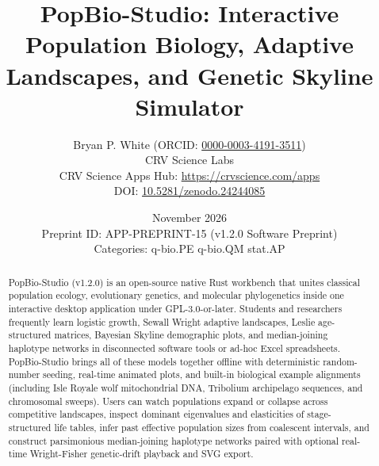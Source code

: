 \documentclass[10pt,letterpaper]{article}
\title{\textbf{PopBio-Studio: Interactive Population Biology, Adaptive Landscapes, and Genetic Skyline Simulator}}
\author{Bryan P. White (ORCID: \href{https://orcid.org/0000-0003-4191-3511}{0000-0003-4191-3511}) \\ CRV Science Labs \\ \small CRV Science Apps Hub: \url{https://crvscience.com/apps} \\ \small DOI: \href{https://doi.org/10.5281/zenodo.24244085}{10.5281/zenodo.24244085}}
\date{November 2026 \\ \small Preprint ID: APP-PREPRINT-15 (v1.2.0 Software Preprint) \\ \small Categories: q-bio.PE \textbullet{} q-bio.QM \textbullet{} stat.AP}
\begin{document}
\maketitle

\begin{abstract}
PopBio-Studio (v1.2.0) is an open-source native Rust workbench that unites classical population ecology, evolutionary genetics, and molecular phylogenetics inside one interactive desktop application under GPL-3.0-or-later. Students and researchers frequently learn logistic growth, Sewall Wright adaptive landscapes, Leslie age-structured matrices, Bayesian Skyline demographic plots, and median-joining haplotype networks in disconnected software tools or ad-hoc Excel spreadsheets. PopBio-Studio brings all of these models together offline with deterministic random-number seeding, real-time animated plots, and built-in biological example alignments (including Isle Royale wolf mitochondrial DNA, Tribolium archipelago sequences, and chromosomal sweeps). Users can watch populations expand or collapse across competitive landscapes, inspect dominant eigenvalues and elasticities of stage-structured life tables, infer past effective population sizes from coalescent intervals, and construct parsimonious median-joining haplotype networks paired with optional real-time Wright-Fisher genetic-drift playback and SVG export.
\end{abstract}
\end{document}
